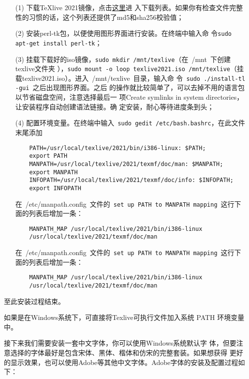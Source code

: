 \begin{enumerate}
\item[(1)] 下载\TeX{}live 2021镜像，点击\href{http://ftp.ctex.org/mirrors/CTAN/systems/texlive/Images/}{这里}进
  入下载列表。如果你有检查文件完整性的习惯的话，这个列表还提供了md5和sha256校验值；
\item[(2)] 安装perl-tk包，以便使用图形界面进行安装。在终端中输入命
  令\texttt{sudo apt-get install perl-tk}；
\item[(3)] 挂载下载好的iso镜像，\texttt{sudo mkdir
    /mnt/texlive}（在~{/mnt}~下创建texlive文件夹
  ），\texttt{sudo mount -o loop texlive2021.iso
    /mnt/texlive}（挂载texlive2021.iso）。进入~/mnt/texlive~目录，输入命
  令~\texttt{sudo ./install-tl -gui}~之后出现图形界面。之后
  的操作就比较简单了，可以去掉不用的语言包以节省磁盘空间，注意选择最后一
  项Create symlinks in system directories，让安装程序自动创建语法链接。确
  定安装，耐心等待进度条到头；
\item[(4)] 配置环境变量。在终端中输入~\texttt{sudo gedit
    /etc/bash.bashrc}，在此文件末尾添加

  \begin{lstlisting}
    PATH=/usr/local/texlive/2021/bin/i386-linux: $PATH;
    export PATH
    MANPATH=/usr/local/texlive/2021/texmf/doc/man: $MANPATH;
    export MANPATH
    INFOPATH=/usr/local/texlive/2021/texmf/doc/info: $INFOPATH;
    export INFOPATH
  \end{lstlisting}

  在~{/etc/manpath.config}~文件的~\texttt{set up PATH to
    MANPATH mapping}~这行下面的列表后增加一条：
  \begin{lstlisting}
    MANPATH_MAP /usr/local/texlive/2021/bin/i386-linux
    /usr/local/texlive/2021/texmf/doc/man
  \end{lstlisting}

  在~{/etc/manpath.config}~文件的~\texttt{set up PATH to
    MANPATH mapping}~这行下面的列表后增加一条：
  \begin{lstlisting}
    MANPATH_MAP /usr/local/texlive/2021/bin/i386-linux
    /usr/local/texlive/2021/texmf/doc/man
  \end{lstlisting}
\end{enumerate}
至此安装过程结束。

如果是在Windows系统下，可直接将Texlive可执行文件加入系统 PATH 环境变量中。

接下来我们需要安装一套中文字体，你可以使用Windows系统默认字
体，但要注意选择的字体最好是包含宋体、黑体、楷体和仿宋的完整套装。如果想获得
更好的显示效果，也可以使用Adobe等其他中文字体。Adobe字体的安装及配置过程如下：

